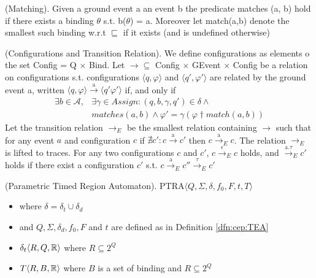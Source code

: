 			\begin{dfn}
				(Matching).
				Given a ground event a an event b the predicate matches (a, b) hold if there exists a binding $\theta$ s.t. b($\theta$) = a.
				Moreover let match(a,b) denote the smallest such binding w.r.t $\sqsubseteq$ if it exists (and is undefined otherwise)
			\end{dfn}
			
			\begin{dfn}
				(Configurations and Transition Relation).
				We define configurations as elements o the set Config = Q $\times$ Bind. Let $\rightarrow \subseteq$ Config $\times$ GEvent $\times$ Config be a relation on
				configurations s.t. configurations $\langle q, \varphi \rangle$ and $\langle q', \varphi' \rangle$ are related by the ground event a, written
				$\langle q, \varphi \rangle \xrightarrow{\text{a}} \langle q' \varphi' \rangle$ if, and only if
					\begin{align}
						\exists b \in \mathcal{A}, & \exists \gamma \in Assign : (q, b, \gamma, q') \in \delta \wedge \\
						&matches(a,b) \wedge \varphi' = \gamma(\varphi \dagger match(a,b))
					\end{align}
				Let the transition relation $\rightarrow_{E}$ be the smallest relation containing $\rightarrow$ such that for any event
				$a$ and configuration $c$ if $\nexists c' : c \xrightarrow{\text{a}} c'$ then $ c \xrightarrow{\text{a}}_E c$.
				The relation $\rightarrow_E$ is lifted to traces.
				For any two configurations $c$ and $c'$, $ c \xrightarrow{\text{$\epsilon$}}_E c$ holds, and $\xrightarrow{\text{a.$\tau$}}_E c'$ holds
				if there exist a configuration $c'$ s.t. $c \xrightarrow{\text{a}}_E c'' \xrightarrow{\text{$\tau$}}_E c'$
			\end{dfn}
			
			
			
			\begin{dfn}
				(Parametric Timed Region Automaton).
				PTRA$\langle Q, \Sigma, \delta, f_0, F, t, T \rangle$
				\begin{itemize}
					\item where $\delta = \delta_t \cup \delta_d$
					\item and $Q, \Sigma, \delta_d, f_0, F$ and $t$ are defined as in Definition \ref{dfn:cep:TEA}
					\item $\delta_t \langle R, Q, \mathbb{R} \rangle $ where $R \subseteq 2^Q$
					\item $T\langle R, B, \mathbb{R} \rangle$ where $B$ is a set of binding and  $R \subseteq 2^Q$

				\end{itemize}
				
			\end{dfn}
			
